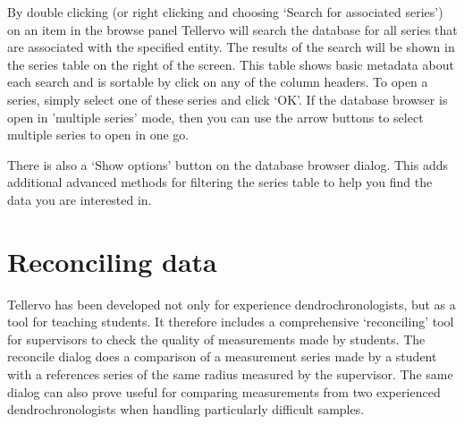 By double clicking (or right clicking and choosing `Search for associated series') on an item in the browse panel Tellervo will search the database for all series that are associated with the specified entity.  The results of the search will be shown in the series table on the right of the screen.  This table shows basic metadata about each search and is sortable by click on any of the column headers.  To open a series, simply select one of these series and click `OK'.  If the database browser is open in 'multiple series' mode, then you can use the arrow buttons to select multiple series to open in one go.

There is also a `Show options' button on the database browser dialog.  This adds additional advanced methods for filtering the series table to help you find the data you are interested in.

\section{Reconciling data}
Tellervo has been developed not only for experience dendrochronologists, but as a tool for teaching students.  It therefore includes a comprehensive `reconciling' tool for supervisors to check the quality of measurements made by students.  The reconcile dialog does a comparison of a measurement series made by a student with a references series of the same radius measured by the supervisor.  The same dialog can also prove useful for comparing measurements from two experienced dendrochronologists when handling particularly difficult samples.

 


